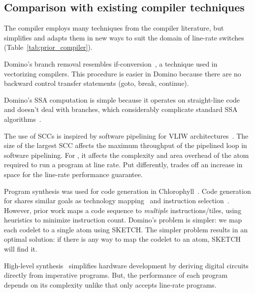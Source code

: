 \subsection{Comparison with existing compiler techniques}

The \pktlanguage compiler employs many techniques from the compiler literature,
but simplifies and adapts them in new ways to suit the domain of line-rate
switches (Table~\ref{tab:prior_compiler}).
\begin{CompactEnumerate}
  \item Domino's branch removal resembles if-conversion~\cite{if_conversion}, a
    technique used in vectorizing compilers. This procedure is easier in Domino
    because there are no backward control transfer statements (goto, break,
    continue).
  \item Domino's SSA computation is simple because it operates on
    straight-line code and doesn't deal with branches, which considerably
    complicate standard SSA algorithms~\cite{ssa}.
  \item The use of SCCs is inspired by software pipelining for VLIW
    architectures~\cite{software_pipelining}. The size of the largest SCC
    affects the maximum throughput of the pipelined loop in software
    pipelining. For \pktlanguage, it affects the complexity and area overhead
    of the atom required to run a program at line rate. Put differently,
    \pktlanguage trades off an increase in space for the line-rate performance
    guarantee.
  \item Program synthesis was used for code generation in
    Chlorophyll~\cite{chlorophyll}.  Code generation for \pktlanguage shares
    similar goals as technology mapping~\cite{micheli, flowmap, spectransform}
    and instruction selection~\cite{muchnik}.  However, prior work maps a code
    sequence to \textit{multiple} instructions/tiles, using heuristics to
    minimize instruction count. Domino's problem is simpler: we map each
    codelet to a single atom using SKETCH.  The simpler problem results in an
    optimal solution: if there is any way to map the codelet to an atom, SKETCH
    will find it.
  \item High-level synthesis~\cite{nurvadathi, cash, bluespec, vivado}
    simplifies hardware development by deriving digital circuits directly from
    imperative programs. But, the performance of each program depends on its
    complexity unlike \pktlanguage that only accepts line-rate programs.
\end{CompactEnumerate}

